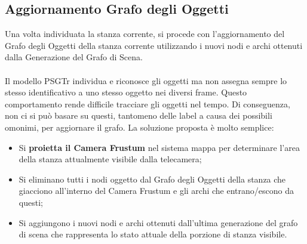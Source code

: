 \subsection{Aggiornamento Grafo degli Oggetti}
Una volta individuata la stanza corrente, si procede con l'aggiornamento del Grafo degli Oggetti della stanza corrente utilizzando i nuovi nodi e archi ottenuti dalla Generazione del Grafo di Scena.\\\\
Il modello PSGTr individua e riconosce gli oggetti ma  non assegna sempre lo stesso identificativo a uno stesso oggetto nei diversi frame. Questo comportamento rende difficile tracciare gli oggetti nel tempo. Di conseguenza, non ci si può basare su questi, tantomeno delle label a causa dei possibili omonimi, per aggiornare il grafo. La soluzione proposta è molto semplice:
\begin{itemize}
  \item Si \textbf{proietta il Camera Frustum} nel sistema mappa per determinare l'area della stanza attualmente visibile dalla telecamera;
  \item Si eliminano tutti i nodi oggetto dal Grafo degli Oggetti della stanza che giacciono all'interno del Camera Frustum e gli archi che entrano/escono da questi;
  \item Si aggiungono i nuovi nodi e archi ottenuti dall'ultima generazione del grafo di scena che rappresenta lo stato attuale della porzione di stanza visibile.
\end{itemize}

